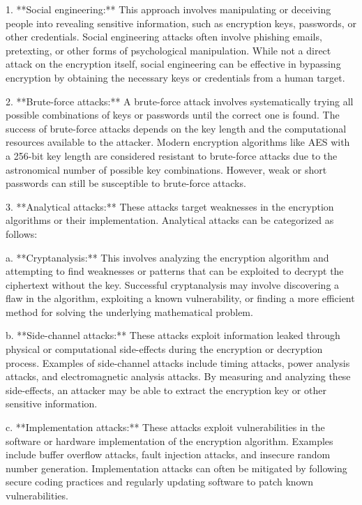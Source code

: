 \documentclass{article}
\begin{document}
1. **Social engineering:** This approach involves manipulating or deceiving people into revealing sensitive information, such as encryption keys, passwords, or other credentials. Social engineering attacks often involve phishing emails, pretexting, or other forms of psychological manipulation. While not a direct attack on the encryption itself, social engineering can be effective in bypassing encryption by obtaining the necessary keys or credentials from a human target.

2. **Brute-force attacks:** A brute-force attack involves systematically trying all possible combinations of keys or passwords until the correct one is found. The success of brute-force attacks depends on the key length and the computational resources available to the attacker. Modern encryption algorithms like AES with a 256-bit key length are considered resistant to brute-force attacks due to the astronomical number of possible key combinations. However, weak or short passwords can still be susceptible to brute-force attacks.

3. **Analytical attacks:** These attacks target weaknesses in the encryption algorithms or their implementation. Analytical attacks can be categorized as follows:

   a. **Cryptanalysis:** This involves analyzing the encryption algorithm and attempting to find weaknesses or patterns that can be exploited to decrypt the ciphertext without the key. Successful cryptanalysis may involve discovering a flaw in the algorithm, exploiting a known vulnerability, or finding a more efficient method for solving the underlying mathematical problem.
   
   b. **Side-channel attacks:** These attacks exploit information leaked through physical or computational side-effects during the encryption or decryption process. Examples of side-channel attacks include timing attacks, power analysis attacks, and electromagnetic analysis attacks. By measuring and analyzing these side-effects, an attacker may be able to extract the encryption key or other sensitive information.
   
   c. **Implementation attacks:** These attacks exploit vulnerabilities in the software or hardware implementation of the encryption algorithm. Examples include buffer overflow attacks, fault injection attacks, and insecure random number generation. Implementation attacks can often be mitigated by following secure coding practices and regularly updating software to patch known vulnerabilities.
\end{document}
